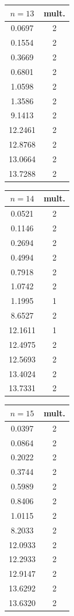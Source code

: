 \documentclass[11pt]{article}
\numberwithin{equation}{section}\newtheorem*{jepEnonce}{\jepEnonceTitle}\newenvironment{enonce*}[1]{\def\jepEnonceTitle{#1}\jepEnonce}{\endjepEnonce}\newtheorem*{conj*}{Conjecture}
\theoremstyle{plain}
\theoremstyle{definition}
\begin{document}
\begin{table}
\medskip
\raisebox{12.5pt}
{\begin{minipage}{.2\textwidth}
\begin{tabular}{|c|c|}
\hline
$n = 13$ & mult.\\ \hline
0.0697&2 \\
0.1554&2 \\
0.3669&2 \\
0.6801&2 \\
1.0598&2 \\
1.3586&2 \\
9.1413&2 \\
12.2461&2 \\
12.8768&2 \\
13.0664&2 \\
13.7288&2 \\
\hline
\end{tabular}
\end{minipage}}
\begin{minipage}{.2\textwidth}
\begin{tabular}{|c|c|}
\hline
$n = 14$ & mult.\\ \hline
0.0521&2 \\
0.1146&2 \\
0.2694&2 \\
0.4994&2 \\
0.7918&2 \\
1.0742&2 \\
1.1995&1 \\
8.6527&2 \\
12.1611& 1 \\
12.4975&2 \\
12.5693&2 \\
13.4024&2 \\
13.7331&2 \\
\hline
\end{tabular}
\end{minipage}
\begin{minipage}{.2\textwidth}
\begin{tabular}{|c|c|}
\hline
$n = 15$ & mult.\\ \hline
0.0397&2 \\
0.0864&2 \\
0.2022&2 \\
0.3744&2 \\
0.5989&2 \\
0.8406&2 \\
1.0115&2 \\
8.2033&2 \\
12.0933&2 \\
12.2933&2 \\
12.9147&2 \\
13.6292&2 \\
13.6320&2 \\
\hline
\end{tabular}
\end{minipage}
\end{table}
\end{document}

